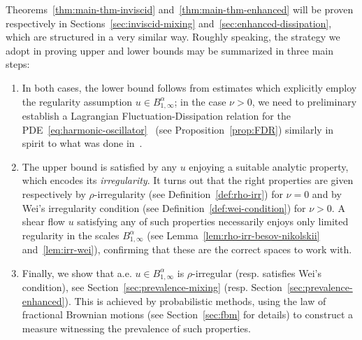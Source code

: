 \documentclass[11pt,oneside,reqno]{amsart}
\newcommand{\tmtextit}[1]{{{\itshape{#1}}}}
\newenvironment{enumeratenumeric}{\begin{enumerate}[1.] }{\end{enumerate}}
\numberwithin{equation}{section}
\begin{document}
Theorems~\ref{thm:main-thm-inviscid} and~\ref{thm:main-thm-enhanced} will be
proven respectively in Sections~\ref{sec:inviscid-mixing}
and~\ref{sec:enhanced-dissipation}, which are structured in a very similar
way. Roughly speaking, the strategy we adopt in proving upper and lower bounds
may be summarized in three main steps:
\begin{enumeratenumeric}
  \item In both cases, the lower bound follows from estimates which explicitly
  employ the regularity assumption $u \in B^{\alpha}_{1, \infty}$; in the case
  $\nu > 0$, we need to preliminary establish a Lagrangian
  Fluctuation-Dissipation relation for the PDE~\eqref{eq:harmonic-oscillator}
  \ (see Proposition~\ref{prop:FDR}) similarly in spirit to what was done
  in~{\cite{zelatidrivas}}.
  
  \item The upper bound is satisfied by any $u$ enjoying a suitable analytic
  property, which encodes its \tmtextit{irregularity}. It turns out that the
  right properties are given respectively by $\rho$-irregularity (see
  Definition~\ref{def:rho-irr}) for $\nu = 0$ and by Wei's irregularity
  condition (see Definition~\ref{def:wei-condition}) for $\nu > 0$. A shear
  flow $u$ satisfying any of such properties necessarily enjoys only limited
  regularity in the scales $B^{\alpha}_{1, \infty}$ (see
  Lemma~\ref{lem:rho-irr-besov-nikolskii} and~\ref{lem:irr-wei}), confirming
  that these are the correct spaces to work with.
  
  \item Finally, we show that a.e. $u \in B^{\alpha}_{1, \infty}$ is
  $\rho$-irregular (resp. satisfies Wei's condition), see
  Section~\ref{sec:prevalence-mixing} (resp.
  Section~\ref{sec:prevalence-enhanced}). This is achieved by probabilistic
  methods, using the law of fractional Brownian motions (see
  Section~\ref{sec:fbm} for details) to construct a measure witnessing the
  prevalence of such properties.
\end{enumeratenumeric}
\end{document}
